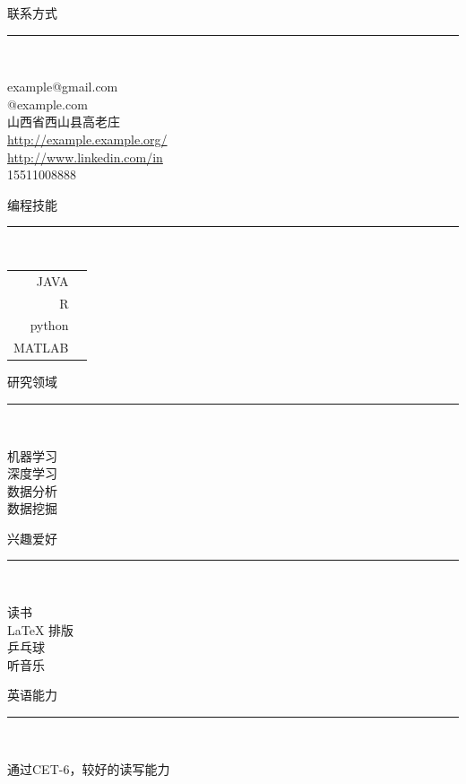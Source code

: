 \documentclass{ctexart}
\newcommand\leftsection[2]{
\vspace*{0.5em}
\centering
{\heiti\textcolor{sectioncol}{#1 	\\
\rule[0.7em]{3.5cm}{1pt}}}\\
\vspace{-0.7em}
#2
\par
}
\newcommand{\information}[2]{
{\zihao{5}  \color{symbolcol}  #1}\hspace{0.2em} #2}
\begin{document}
\begin{paracol}{2}
\begin{leftcolumn}
\leftsection{联系方式}{
\information{\faEnvelope}{example@gmail.com}\\
\information{\faTwitter}{@example.com}\\
\information{\faMapMarker}{山西省西山县高老庄}\\
\information{\faGlobe}{\url{http://example.example.org/}}\\
\information{\faLinkedin}{\url{ http://www.linkedin.com/in}}\\
\information{ \faPhone}{15511008888}
}

\leftsection{编程技能}{  
\begin{tabular}{rl}
JAVA & \textcolor{symbolcol}{\faStar \faStar \faStar \faStarHalfEmpty \faStarO}\\
R  &  \textcolor{symbolcol}{\faStar \faStar \faStarHalfEmpty \faStarO \faStarO}\\
python  &  \textcolor{symbolcol}{\faStar  \faStarHalfEmpty \faStarO \faStarO \faStarO}\\
MATLAB  &  \textcolor{symbolcol}{\faStar  \faStarHalfEmpty \faStarO \faStarO \faStarO}
\end{tabular}
}
\leftsection{研究领域}{
机器学习\\
深度学习\\
数据分析\\
数据挖掘
}

\leftsection{兴趣爱好}{
读书\\
\LaTeX{} 排版\\
乒乓球\\
听音乐
}

\leftsection{英语能力}{
通过CET-6，较好的读写能力
}



\end{leftcolumn}
\end{paracol}
\end{document}
